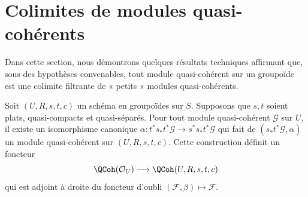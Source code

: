 \section{Colimites de modules quasi-cohérents}
\label{section-colimits}

\noindent
Dans cette section, nous démontrons quelques résultats techniques affirmant que, sous
des hypothèses convenables, tout module quasi-cohérent sur un groupoïde est
une colimite filtrante de « petits » modules quasi-cohérents.

\begin{lemma}
\label{lemma-construct-quasi-coherent}
Soit $(U, R, s, t, c)$ un schéma en groupoïdes sur $S$.
Supposons que $s, t$ soient plats, quasi-compacts et quasi-séparés.
Pour tout module quasi-cohérent $\mathcal{G}$ sur $U$, il existe
un isomorphisme canonique
$\alpha : t^*s_*t^*\mathcal{G} \to s^*s_*t^*\mathcal{G}$
qui fait de $(s_*t^*\mathcal{G}, \alpha)$ un module quasi-cohérent
sur $(U, R, s, t, c)$. Cette construction définit un foncteur
$$
\QCoh(\mathcal{O}_U) \longrightarrow \QCoh(U, R, s, t, c)
$$
qui est adjoint à droite du foncteur d'oubli
$(\mathcal{F}, \beta) \mapsto \mathcal{F}$.
\end{lemma}


